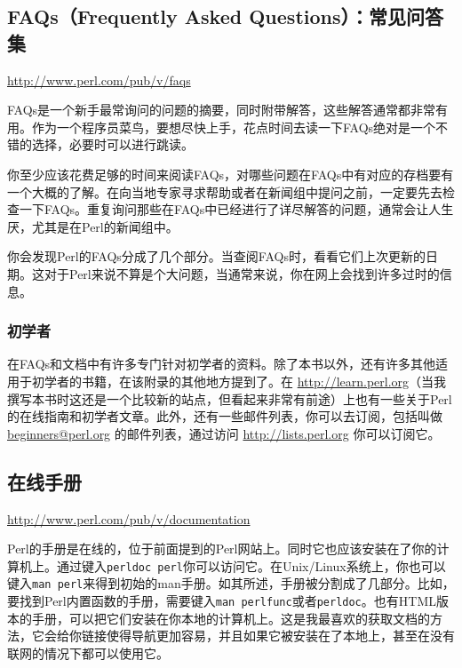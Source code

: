 \subsection{FAQs（Frequently Asked Questions）：常见问答集}
\href{http://www.perl.com/pub/v/faqs}{http://www.perl.com/pub/v/faqs}

\begin{adjustwidth}{4em}{}
FAQs是一个新手最常询问的问题的摘要，同时附带解答，这些解答通常都非常有用。作为一个程序员菜鸟，要想尽快上手，花点时间去读一下FAQs绝对是一个不错的选择，必要时可以进行跳读。
\end{adjustwidth}

你至少应该花费足够的时间来阅读FAQs，对哪些问题在FAQs中有对应的存档要有一个大概的了解。在向当地专家寻求帮助或者在新闻组中提问之前，一定要先去检查一下FAQs。重复询问那些在FAQs中已经进行了详尽解答的问题，通常会让人生厌，尤其是在Perl的新闻组中。

你会发现Perl的FAQs分成了几个部分。当查阅FAQs时，看看它们上次更新的日期。这对于Perl来说不算是个大问题，当通常来说，你在网上会找到许多过时的信息。

\subsubsection{初学者}
在FAQs和文档中有许多专门针对初学者的资料。除了本书以外，还有许多其他适用于初学者的书籍，在该附录的其他地方提到了。在 \href{http://learn.perl.org}{http://learn.perl.org}（当我撰写本书时这还是一个比较新的站点，但看起来非常有前途）上也有一些关于Perl的在线指南和初学者文章。此外，还有一些邮件列表，你可以去订阅，包括叫做 \href{mailto:beginners@perl.org}{beginners@perl.org} 的邮件列表，通过访问 \href{http://lists.perl.org}{http://lists.perl.org} 你可以订阅它。

\subsection{在线手册}
\href{http://www.perl.com/pub/v/documentation}{http://www.perl.com/pub/v/documentation}

\begin{adjustwidth}{4em}{}
Perl的手册是在线的，位于前面提到的Perl网站上。同时它也应该安装在了你的计算机上。通过键入\verb|perldoc perl|你可以访问它。在Unix/Linux系统上，你也可以键入\verb|man perl|来得到初始的man手册。如其所述，手册被分割成了几部分。比如，要找到Perl内置函数的手册，需要键入\verb|man perlfunc|或者\verb|perldoc|。也有HTML版本的手册，可以把它们安装在你本地的计算机上。这是我最喜欢的获取文档的方法，它会给你链接使得导航更加容易，并且如果它被安装在了本地上，甚至在没有联网的情况下都可以使用它。
\end{adjustwidth}

